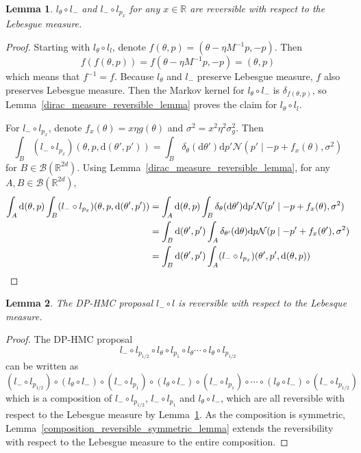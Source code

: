 \documentclass[english,twoside,openright]{HYgraduMLDS}
\newtheorem{lemma}{Lemma}
\newcommand{\R}{\mathbb{R}}
\newcommand{\dx}{\mathrm{d}}
\newcommand{\caln}{{\mathcal{N}}}
\begin{document}
\begin{lemma}\label{leapfrog_step_reversible_lemma}
  \(l_{\theta}\circ l_{-}\) and \(l_{-}\circ l_{p_{x}}\) for any \(x\in \R\)
  are reversible with respect to the Lebesgue measure.
\end{lemma}
\begin{proof}
  Starting with \(l_{\theta}\circ l_{l}\), denote
  \(f(\theta, p) = (\theta - \eta M^{-1}p, -p)\). Then
  \[
    f(f(\theta, p)) = f(\theta - \eta M^{-1}p, -p) = (\theta, p)
  \]
  which means that \(f^{-1} = f\). Because \(l_{\theta}\) and \(l_{-}\) preserve
  Lebesgue measure, \(f\) also preserves Lebesgue measure.
  Then the Markov kernel for \(l_{\theta}\circ l_{-}\) is \(\delta_{f(\theta, p)}\),
  so Lemma~\ref{dirac_measure_reversible_lemma} proves the claim for
  \(l_{\theta}\circ l_{l}\).

  For \(l_{-}\circ l_{p_{x}}\), denote \(f_{x}(\theta) = x\eta g(\theta)\) and
  \(\sigma^{2} = x^{2}\eta^{2}\sigma_{g}^{2}\). Then
  \[
    \int_{B}(l_{-}\circ l_{p_{x}})(\theta, p, \dx(\theta', p')) =
    \int_{B}\delta_{\theta}(\dx \theta')\dx p'\caln(p'\mid -p + f_{x}(\theta), \sigma^{2})
  \]
  for \(B\in \mathcal{B}(\R^{2d})\).
  Using Lemma~\ref{dirac_measure_reversible_lemma},
  for any \(A, B\in \mathcal{B}(\R^{2d})\),
	\begin{align*}
    \int_{A}\dx(\theta, p)\int_{B}(l_{-}\circ l_{p_{x}})(\theta, p, \dx(\theta', p'))
    &= \int_{A}\dx(\theta, p)\int_{B}\delta_{\theta}(\dx \theta')\dx p'
      \caln(p'\mid -p + f_{x}(\theta), \sigma^{2})
    \\&= \int_{B}\dx(\theta', p')\int_{A}\delta_{\theta'}(\dx \theta)\dx p
    \caln(p\mid -p' + f_{x}(\theta'), \sigma^{2})
    \\&= \int_{B}\dx(\theta', p')\int_{A}(l_{-}\circ l_{p_{x}})(\theta', p', \dx(\theta, p))
    \qedhere
  \end{align*}
\end{proof}

\begin{lemma}\label{leapfrog_reversibility_lemma}
	The DP-HMC proposal \(l_{-} \circ l\) is reversible with respect
  to the Lebesque measure.
\end{lemma}
\begin{proof}
  The DP-HMC proposal
  \[
    l_{-}\circ l_{p_{1/2}}\circ l_{\theta}\circ l_{p_{1}}\circ l_{\theta}
    \dotsb \circ l_{\theta}\circ l_{p_{1/2}}
  \]
  can be written as
  \[
    (l_{-}\circ l_{p_{1/2}})\circ (l_{\theta} \circ l_{-})\circ (l_{-}\circ l_{p_{1}})
    \circ (l_{\theta} \circ l_{-}) \circ (l_{-} \circ l_{p_{1}})\circ
    \dotsb \circ (l_{\theta}\circ l_{-})\circ (l_{-}\circ l_{p_{1/2}})
  \]
  which is a composition of \(l_{-}\circ l_{p_{1/2}}\), \(l_{-}\circ l_{p_{1}}\)
  and \(l_{\theta}\circ l_{-}\), which are all reversible with respect to the
  Lebesgue measure by Lemma~\ref{leapfrog_step_reversible_lemma}.
  As the composition is symmetric,
  Lemma~\ref{composition_reversible_symmetric_lemma} extends the reversibility
  with respect to the Lebesgue measure to the entire composition.
\end{proof}
\end{document}
